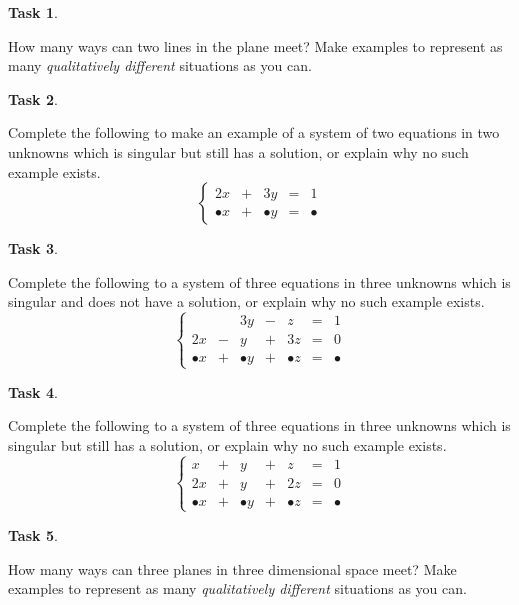 \documentclass[10pt,]{book}
\theoremstyle{plain}
\theoremstyle{definition}
\numberwithin{equation}{section}
\newtheorem{task}{Task}[chapter]
\begin{document}
\begin{task}
\label{task-42}

          How many ways can two lines in the plane meet? Make examples to
          represent as many \emph{qualitatively different} situations as you can.
        \end{task}
\begin{task}
\label{task-43}

          Complete the following to make an example of a system of two equations
          in two unknowns which is singular but still has a solution, or explain why
          no such example exists.
          \[
            \left\{
            \begin{array}{ccccc}
            2x & + & 3y & = & 1 \\
            \bullet x & + & \bullet y & = & \bullet
            \end{array}\right.
          \]\end{task}
\begin{task}
\label{task-44}

          Complete the following to a system of three equations in three
          unknowns which is singular and does not have a solution, or explain
          why no such example exists.
          \[
            \left\{
            \begin{array}{ccccccc}
               &  & 3y & - & z & = & 1 \\
            2x & - & y & + & 3z & = & 0 \\
            \bullet x & + & \bullet y & + &\bullet z &  = & \bullet
            \end{array}\right.
          \]\end{task}
\begin{task}
\label{task-45}

          Complete the following to a system of three equations in three
          unknowns which is singular but still has a solution, or explain why
          no such example exists.
          \[
            \left\{
            \begin{array}{ccccccc}
            x & + & y & + & z & = & 1 \\
            2x & + & y & + & 2z & = & 0 \\
            \bullet x & + & \bullet y & + &\bullet z &  = & \bullet
            \end{array}\right.
          \]\end{task}
\begin{task}
\label{task-46}

          How many ways can three planes in three dimensional space meet? Make
          examples to represent as many \emph{qualitatively different}
          situations as you can.
        \end{task}
\clearpage
\typeout{************************************************}
\typeout{************************************************}
\end{document}
